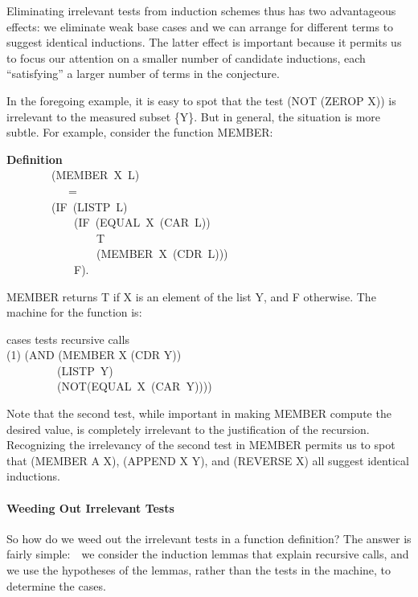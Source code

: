 \documentclass[10pt]{book}
\newenvironment{pubasis}{\begin{flushleft}}{\end{flushleft}}
\newcommand{\axiomordefinition}[1]{\vspace{6pt}\Large\textsf{\textbf{#1}}\normalsize}
\begin{document}
Eliminating irrelevant tests from induction schemes thus
has two advantageous effects:  we eliminate weak base cases and
we can arrange for different terms to suggest identical inductions.
The latter effect is important because it permits us to focus our
attention on a smaller number of candidate inductions, each
``satisfying'' a larger number of terms in the conjecture.

In the foregoing example, it is easy to spot that the test (NOT (ZEROP X))
is irrelevant to the measured subset \{Y\}.  But in general, the
situation is more subtle.  For example, consider the function MEMBER:
\begin{pubasis}
\axiomordefinition{Definition}\\
~~~~~~~~(MEMBER~X~L)\\
~~~~~~~~~~~=\\
~~~~~~~~(IF~(LISTP~L)\\
~~~~~~~~~~~~(IF~(EQUAL~X~(CAR~L))\\
~~~~~~~~~~~~~~~~T\\
~~~~~~~~~~~~~~~~(MEMBER~X~(CDR~L)))\\
~~~~~~~~~~~~F).\\
\end{pubasis}
MEMBER returns T if X is an element of the list Y, and F otherwise.
The machine for the function is:
\begin{pubasis}
cases	   tests		recursive calls\\

(1)	(AND			(MEMBER X (CDR Y))\\
~~~~~~~~~(LISTP~Y)\\
~~~~~~~~~(NOT(EQUAL~X~(CAR~Y))))\\
\end{pubasis}
Note that the second test, while important in making MEMBER compute
the desired value, is completely irrelevant to the justification of the
recursion.  Recognizing the irrelevancy of the second test in MEMBER
permits us to spot that (MEMBER A X), (APPEND X Y), and (REVERSE X)
all suggest identical inductions.

\paragraph{Weeding Out Irrelevant Tests}
So how do we weed out the irrelevant tests in a function definition?
The answer is fairly simple:~~we consider the induction lemmas that
explain recursive calls,
and we  use the hypotheses of the lemmas,
rather than the tests in the machine,
to determine the cases.
\end{document}
